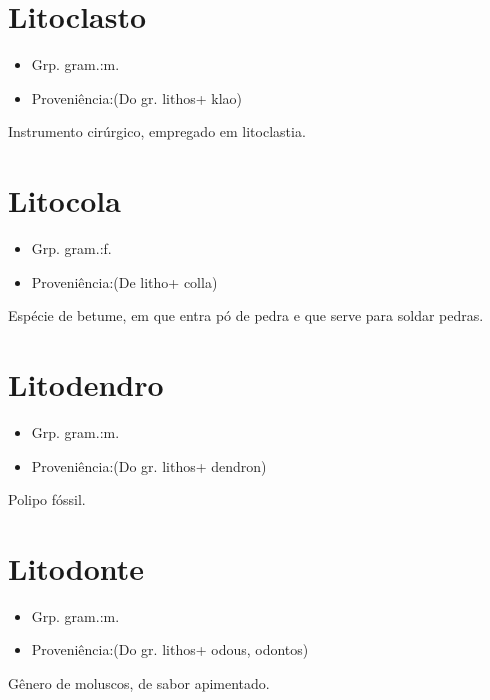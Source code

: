 \section{Litoclasto}
\begin{itemize}
\item {Grp. gram.:m.}
\end{itemize}
\begin{itemize}
\item {Proveniência:(Do gr. \textunderscore lithos\textunderscore  + \textunderscore klao\textunderscore )}
\end{itemize}
Instrumento cirúrgico, empregado em litoclastia.
\section{Litocola}
\begin{itemize}
\item {Grp. gram.:f.}
\end{itemize}
\begin{itemize}
\item {Proveniência:(De \textunderscore litho\textunderscore  + \textunderscore colla\textunderscore )}
\end{itemize}
Espécie de betume, em que entra pó de pedra e que serve para soldar pedras.
\section{Litodendro}
\begin{itemize}
\item {Grp. gram.:m.}
\end{itemize}
\begin{itemize}
\item {Proveniência:(Do gr. \textunderscore lithos\textunderscore  + \textunderscore dendron\textunderscore )}
\end{itemize}
Polipo fóssil.
\section{Litodonte}
\begin{itemize}
\item {Grp. gram.:m.}
\end{itemize}
\begin{itemize}
\item {Proveniência:(Do gr. \textunderscore lithos\textunderscore  + \textunderscore odous\textunderscore , \textunderscore odontos\textunderscore )}
\end{itemize}
Gênero de moluscos, de sabor apimentado.
